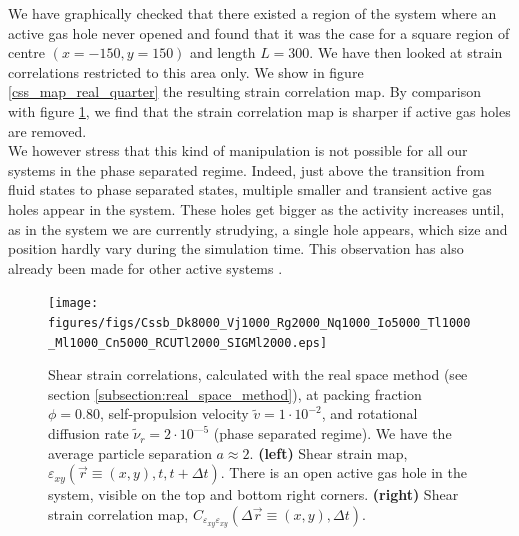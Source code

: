 \documentclass[class=report, float=false, crop=false]{standalone}
\begin{document}
We have graphically checked that there existed a region of the system where an active gas hole never opened and found that it was the case for a square region of centre $(x=-150, y=150)$ and length $L=300$. We have then looked at strain correlations restricted to this area only. We show in figure \ref{css_map_real_quarter} the resulting strain correlation map. By comparison with figure \ref{css_map_real}, we find that the strain correlation map is sharper if active gas holes are removed.\\

We however stress that this kind of manipulation is not possible for all our systems in the phase separated regime. Indeed, just above the transition from fluid states to phase separated states, multiple smaller and transient active gas holes appear in the system. These holes get bigger as the activity increases until, as in the system we are currently strudying, a single hole appears, which size and position hardly vary during the simulation time. This observation has also already been made for other active systems \cite{wysocki2014cooperative, levis2014clustering}.\\

\begin{figure}[H]
\centering
\texttt{[image: figures/figs/Cssb\_Dk8000\_Vj1000\_Rg2000\_Nq1000\_Io5000\_Tl1000\_Ml1000\_Cn5000\_RCUTl2000\_SIGMl2000.eps]}
\vspace{-1cm}
\caption{Shear strain correlations, calculated with the real space method (see section \ref{subsection:real_space_method}), at packing fraction $\phi = 0.80$, self-propulsion velocity $\tilde{v} = 1\cdot10^{-2}$, and rotational diffusion rate $\tilde{\nu}_r = 2\cdot10^{—5}$ (phase separated regime). We have the average particle separation $a \approx 2$. \textbf{(left)} Shear strain map, $\varepsilon_{xy}(\vec{r} \equiv (x, y), t, t + \Delta t)$. There is an open active gas hole in the system, visible on the top and bottom right corners. \textbf{(right)} Shear strain correlation map, $C_{\varepsilon_{xy}\varepsilon_{xy}}(\Delta\vec{r} \equiv (x, y), \Delta t)$.}
\label{css_map_real}
\end{figure}
\end{document}
